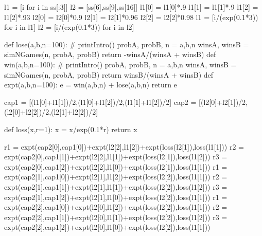 \documentclass[a4paper,AutoFakeBold,AutoFakeSlant]{ctexart}
\begin{document}
\begin{python}
  l1 = [i for i in ss[:3]]
  l2 = [ss[6],ss[9],ss[16]]
  l1[0] = l1[0]*.9
  l1[1] = l1[1]*.9
  l1[2] = l1[2]*.93
  l2[0] = l2[0]*0.9
  l2[1] = l2[1]*0.96
  l2[2] = l2[2]*0.98
  l1 = [i/(exp(0.1*3)) for i in l1]
  l2 = [i/(exp(0.1*3)) for i in l2]

def lose(a,b,n=100):
  # printIntro()
  probA, probB, n = a,b,n
  winsA, winsB = simNGames(n, probA, probB)
  return -winsA/(winsA + winsB)
def win(a,b,n=100):
  # printIntro()
  probA, probB, n = a,b,n
  winsA, winsB = simNGames(n, probA, probB)
  return winsB/(winsA + winsB)
def expt(a,b,n=100):
  e = win(a,b,n) + lose(a,b,n)
  return e

cap1 = [(l1[0]+l1[1])/2,(l1[0]+l1[2])/2,(l1[1]+l1[2])/2]
cap2 = [(l2[0]+l2[1])/2,(l2[0]+l2[2])/2,(l2[1]+l2[2])/2]

def loss(x,r=1):
    x = x/exp(0.1*r)
    return x

r1 = expt(cap2[0],cap1[0])+expt(l2[2],l1[2])+expt(loss(l2[1]),loss(l1[1]))
r2 = expt(cap2[0],cap1[1])+expt(l2[2],l1[1])+expt(loss(l2[1]),loss(l1[2]))
r3 = expt(cap2[0],cap1[2])+expt(l2[2],l1[0])+expt(loss(l2[1]),loss(l1[1]))
r1 = expt(cap2[1],cap1[0])+expt(l2[1],l1[2])+expt(loss(l2[2]),loss(l1[1]))
r2 = expt(cap2[1],cap1[1])+expt(l2[1],l1[1])+expt(loss(l2[2]),loss(l1[2]))
r3 = expt(cap2[1],cap1[2])+expt(l2[1],l1[0])+expt(loss(l2[2]),loss(l1[1]))
r1 = expt(cap2[2],cap1[0])+expt(l2[0],l1[2])+expt(loss(l2[2]),loss(l1[1]))
r2 = expt(cap2[2],cap1[1])+expt(l2[0],l1[1])+expt(loss(l2[2]),loss(l1[2]))
r3 = expt(cap2[2],cap1[2])+expt(l2[0],l1[0])+expt(loss(l2[2]),loss(l1[1]))


\end{python}
\end{document}
